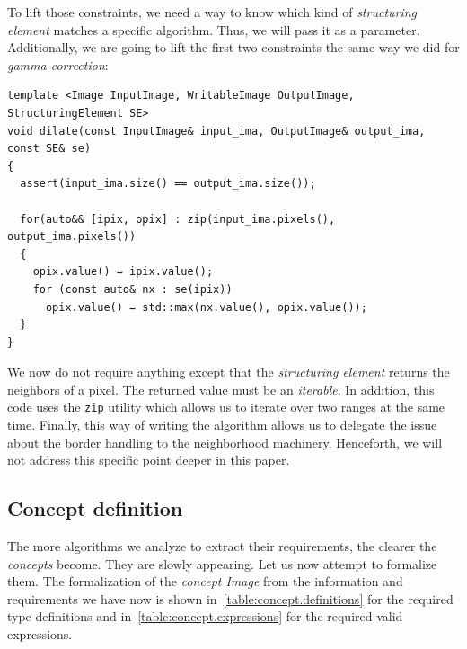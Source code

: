 To lift those constraints, we need a way to know which kind of \emph{structuring element} matches a specific algorithm.
Thus, we will pass it as a parameter. Additionally, we are going to lift the first two constraints the same way we did
for \emph{gamma correction}:

\begin{verbatim}
template <Image InputImage, WritableImage OutputImage, StructuringElement SE>
void dilate(const InputImage& input_ima, OutputImage& output_ima, const SE& se)
{
  assert(input_ima.size() == output_ima.size());

  for(auto&& [ipix, opix] : zip(input_ima.pixels(), output_ima.pixels())
  {
    opix.value() = ipix.value();
    for (const auto& nx : se(ipix))
      opix.value() = std::max(nx.value(), opix.value());
  }
}
\end{verbatim}

\noindent We now do not require anything except that the \emph{structuring element} returns the neighbors of a pixel.
The returned value must be an \emph{iterable}. In addition, this code uses the \texttt{zip} utility which allows us to
iterate over two ranges at the same time. Finally, this way of writing the algorithm allows us to delegate the issue
about the border handling to the neighborhood machinery. Henceforth, we will not address this specific point deeper in
this paper.

\subsection{Concept definition}
\label{subsec:concept}

The more algorithms we analyze to extract their requirements, the clearer the \emph{concepts} become. They are slowly
appearing. Let us now attempt to formalize them. The formalization of the \emph{concept Image} from the information and
requirements we have now is shown in~\cref{table:concept.definitions} for the required type definitions and
in~\cref{table:concept.expressions} for the required valid expressions.

